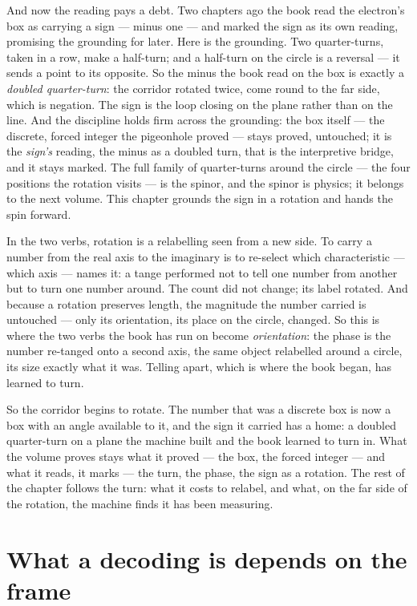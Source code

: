 And now the reading pays a debt. Two chapters ago the book read the electron's box as carrying a sign --- minus one ---
and marked the sign as its own reading, promising the grounding for later. Here is the grounding. Two quarter-turns,
taken in a row, make a half-turn; and a half-turn on the circle is a reversal --- it sends a point to its opposite. So
the minus the book read on the box is exactly a \emph{doubled quarter-turn}: the corridor rotated twice, come round to
the far side, which is negation. The sign is the loop closing on the plane rather than on the line. And the discipline
holds firm across the grounding: the box itself --- the discrete, forced integer the pigeonhole proved --- stays
proved, untouched; it is the \emph{sign's} reading, the minus as a doubled turn, that is the interpretive bridge, and
it stays marked. The full family of quarter-turns around the circle --- the four positions the rotation visits --- is
the spinor, and the spinor is physics; it belongs to the next volume. This chapter grounds the sign in a rotation and
hands the spin forward.

In the two verbs, rotation is a relabelling seen from a new side. To carry a number from the real axis to the imaginary
is to re-select which characteristic --- which axis --- names it: a tange performed not to tell one number from another
but to turn one number around. The count did not change; its label rotated. And because a rotation preserves length,
the magnitude the number carried is untouched --- only its orientation, its place on the circle, changed. So this is
where the two verbs the book has run on become \emph{orientation}: the phase is the number re-tanged onto a second
axis, the same object relabelled around a circle, its size exactly what it was. Telling apart, which is where the book
began, has learned to turn.

So the corridor begins to rotate. The number that was a discrete box is now a box with an angle available to it, and
the sign it carried has a home: a doubled quarter-turn on a plane the machine built and the book learned to turn in.
What the volume proves stays what it proved --- the box, the forced integer --- and what it reads, it marks --- the
turn, the phase, the sign as a rotation. The rest of the chapter follows the turn: what it costs to relabel, and what,
on the far side of the rotation, the machine finds it has been measuring.

\section{What a decoding is depends on the frame}


